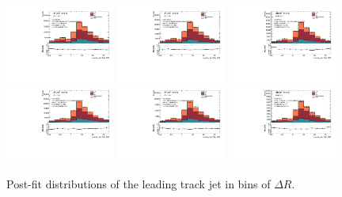\begin{figure}[htbp]
  \centering
 \includegraphics[width=0.32\textwidth]{figures/gbb/Sub_Sd0_Fits/Canv_Fit_02-DeltaR-025_LpT_INF_SpT_INF_coarse_x.pdf}
 \includegraphics[width=0.32\textwidth]{figures/gbb/Sub_Sd0_Fits/Canv_Fit_025-DeltaR-03_LpT_INF_SpT_INF_coarse_x.pdf}
 \includegraphics[width=0.32\textwidth]{figures/gbb/Sub_Sd0_Fits/Canv_Fit_03-DeltaR-04_LpT_INF_SpT_INF_coarse_x.pdf}\\
 \includegraphics[width=0.32\textwidth]{figures/gbb/Sub_Sd0_Fits/Canv_Fit_04-DeltaR-05_LpT_INF_SpT_INF_coarse_x.pdf}
 \includegraphics[width=0.32\textwidth]{figures/gbb/Sub_Sd0_Fits/Canv_Fit_05-DeltaR-06_LpT_INF_SpT_INF_coarse_x.pdf}
 \includegraphics[width=0.32\textwidth]{figures/gbb/Sub_Sd0_Fits/Canv_Fit_06-DeltaR-07_LpT_INF_SpT_INF_coarse_x.pdf}\\


\caption{Post-fit \subsdzero distributions of the leading track jet in bins of $\Delta R$. }
  \label{fig:dR-postfits-leading}
\end{figure}


